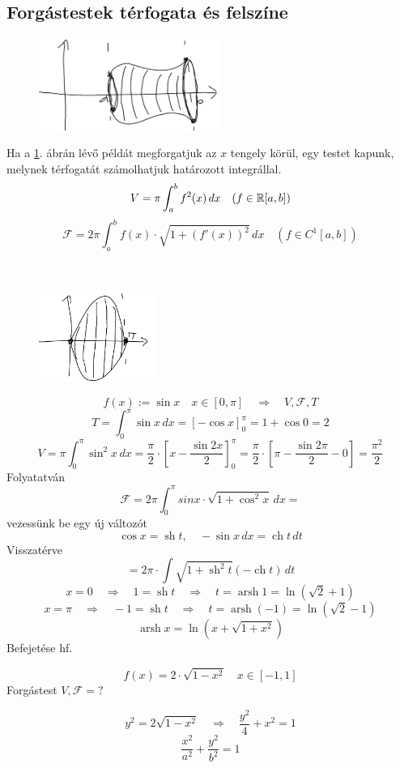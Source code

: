 \documentclass[a4paper,11.5pt]{article}
\DeclareMathOperator{\sh}{sh}
\DeclareMathOperator{\ch}{ch}
\DeclareMathOperator{\arsh}{arsh}
\begin{document}
	\subsection{Forgástestek térfogata és felszíne}
	\begin{revision}
		\begin{figure}[H]
			\centering
			\includegraphics[height=3cm]{kepek/15.png}
			\caption{}\label{rotation}
		\end{figure}
		Ha a \ref{rotation}. ábrán lévő példát megforgatjuk az $x$ tengely körül, egy testet kapunk, melynek térfogatát számolhatjuk határozott integrállal.
		\[ V=\pi\int_a^bf^2(x)\,dx\quad (f\in\mathbb{R}[a,b]) \]
		\[ \mathcal{F}=2\pi\int_a^bf(x)\cdot\sqrt{1+(f'(x))^2}\,dx\quad (f\in C^1[a,b]) \]
	\end{revision}
	\begin{example}\ 
		\begin{figure}[H]
			\centering
			\includegraphics[height=3cm]{kepek/16.png}
			\caption{}
		\end{figure}
		\[ f(x):=\sin x\quad x\in[0,\pi]\quad \Rightarrow\quad V, \mathcal{F}, T \]
		\[ T=\int_0^\pi\sin x\,dx=\left[-\cos x\right]_0^\pi=1+\cos 0=2 \]
		\[ V=\pi\int_0^\pi\sin^2x\,dx=\frac{\pi}{2}\cdot\left[x-\frac{\sin2x}{2}\right]_0^\pi=\frac{\pi}{2}\cdot\left[\pi-\frac{\sin2\pi}{2}-0\right]=\frac{\pi^2}{2} \]
		Folyatatván
		\[ \mathcal{F}=2\pi\int_0^\pi sin x\cdot\sqrt{ 1+\cos^2x}\,dx= \]
		vezessünk be egy új változót
		\[ \cos x=\sh t,\quad -\sin x\,dx=\ch t\,dt \]
		Visszatérve
		\[ =2\pi\cdot\int\sqrt{1+\sh^2t}(-\ch t)\,dt \]
		\[ x=0\quad \Rightarrow\quad 1=\sh t\quad \Rightarrow\quad t=\arsh 1=\ln(\sqrt{2}+1) \]
		\[ x=\pi\quad \Rightarrow\quad -1=\sh t\quad \Rightarrow\quad t=\arsh (-1)=\ln(\sqrt{2}-1) \]
		\[ \arsh x=\ln(x+\sqrt{1+x^2}) \]
		Befejetése hf.
	\end{example}
	\begin{exercise}
		\[ f(x)=2\cdot\sqrt{1-x^2}\quad x\in[-1,1] \]
		Forgástest $V, \mathcal{F}=?$
		
		\[ y^2=2\sqrt{1-x^2}\quad \Rightarrow\quad \frac{y^2}{4}+x^2=1 \]
		\[ \frac{x^2}{a^2}+\frac{y^2}{b^2}=1 \]
	\end{exercise}
\end{document}
